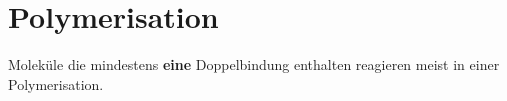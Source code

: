\section{Polymerisation}
Moleküle die mindestens \textbf{eine} Doppelbindung enthalten reagieren meist in einer Polymerisation.
